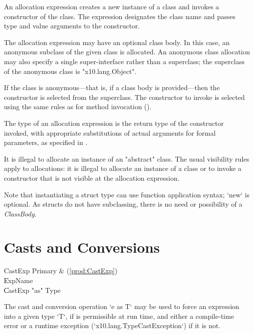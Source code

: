 An allocation expression creates a new instance of a class and
invokes a constructor of the class.
The expression designates the class name and passes
type and value arguments to the constructor.

The allocation expression may have an optional class body.
In this case, an anonymous subclass of the given class is
allocated.   An anonymous class allocation may also specify a
single super-interface rather than a superclass; the superclass
of the anonymous class is \xcd"x10.lang.Object".

If the class is anonymous---that is, if a class body is
provided---then the constructor is selected from the superclass.
The constructor to invoke is selected using the same rules as
for method invocation ().

The type of an allocation expression
is the return type of the constructor invoked, with appropriate
substitutions  of actual arguments for formal parameters, as
specified in .

It is illegal to allocate an instance of an \xcd"abstract" class.
The usual visibility rules apply to allocations: 
it is illegal to allocate an instance of a class or to invoke a
constructor that is not visible at
the allocation expression.

Note that instantiating a struct type can use function application syntax; 
\xcd`new` is optional.  As structs do not have subclassing, there is no need or
possibility of a {\em ClassBody}.


\section{Casts and Conversions}\label{ClassCast}


\begin{bbgrammar}
             CastExp \: Primary & (\ref{prod:CastExp}) \\
                    \| ExpName \\
                    \| CastExp \xcd"as" Type \\
\end{bbgrammar}


The cast and conversion  operation \xcd`e as T` may be used to force an
expression into a given type \xcd`T`, 
if is permissible at run time, and either a compile-time error or a runtime
exception 
(\xcd`x10.lang.TypeCastException`) if it is not.  


